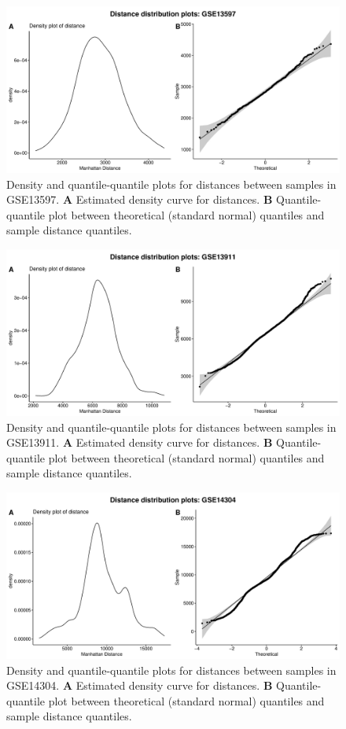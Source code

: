 \documentclass[10pt,letterpaper]{article}\usepackage[]{graphicx}\usepackage[]{color}
\begin{document}
\begin{figure}[H]
	\includegraphics[width=\textwidth]{manhattan-distance_hist_GSE13597.pdf}
	\caption{Density and quantile-quantile plots for distances between samples in GSE13597. \textbf{A} Estimated density curve for distances. \textbf{B} Quantile-quantile plot between theoretical (standard normal) quantiles and sample distance quantiles.}
\end{figure}

\begin{figure}[H]
	\includegraphics[width=\textwidth]{manhattan-distance_hist_GSE13911.pdf}
	\caption{Density and quantile-quantile plots for distances between samples in GSE13911. \textbf{A} Estimated density curve for distances. \textbf{B} Quantile-quantile plot between theoretical (standard normal) quantiles and sample distance quantiles.}
\end{figure}

\begin{figure}[H]
	\includegraphics[width=\textwidth]{manhattan-distance_hist_GSE14304.pdf}
	\caption{Density and quantile-quantile plots for distances between samples in GSE14304. \textbf{A} Estimated density curve for distances. \textbf{B} Quantile-quantile plot between theoretical (standard normal) quantiles and sample distance quantiles.}
\end{figure}
\end{document}

